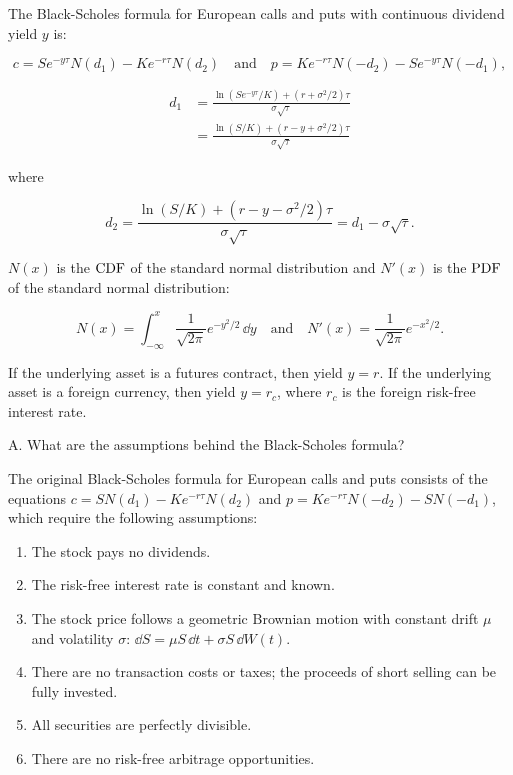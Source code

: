 The Black-Scholes formula for European calls and puts with continuous dividend yield $y$
is:

\[
c=Se^{-y\tau}N(d_1)-Ke^{-r\tau}N(d_2)\quad\text{and}\quad
p=Ke^{-r\tau}N(-d_2)-Se^{-y\tau}N(-d_1),
\]


\[
\begin{aligned}
d_1&=\frac{\ln(Se^{-y\tau}/K)+(r+\sigma^2/2)\tau}{\sigma\sqrt{\tau}}\\
&=\frac{\ln(S/K)+(r-y+\sigma^2/2)\tau}{\sigma\sqrt{\tau}}
\end{aligned}
\]

where

\[
d_2=\frac{\ln(S/K)+(r-y-\sigma^2/2)\tau}{\sigma\sqrt{\tau}}=d_1-\sigma\sqrt{\tau}.
\]

$N(x)$ is the $\mathrm{CDF}$ of the standard normal distribution and $N'(x)$ is the $\mathrm{PDF}$ of the
standard normal distribution:

\[
N(x)=\int_{-\infty}^{x}\frac{1}{\sqrt{2\pi}}e^{-y^2/2}\,\dd y
\quad\text{and}\quad N'(x)=\frac{1}{\sqrt{2\pi}}e^{-x^2/2}.
\]

If the underlying asset is a futures contract, then yield $y=r$. If the underlying asset is a
foreign currency, then yield $y=r_c$, where $r_c$ is the foreign risk-free interest rate.

\begin{problem}{A. What are the assumptions behind the Black-Scholes formula?}
\end{problem}

\begin{solution}
The original Black-Scholes formula for European calls and puts consists of the equations
$c=SN(d_1)-Ke^{-r\tau}N(d_2)$ and
$p=Ke^{-r\tau}N(-d_2)-SN(-d_1)$, which require the following assumptions:

\begin{enumerate}
\item The stock pays no dividends.
\item The risk-free interest rate is constant and known.
\item The stock price follows a geometric Brownian motion with constant drift $\mu$ and
volatility $\sigma$: $\dd S=\mu S\,\dd t+\sigma S\,\dd W(t)$.
\item There are no transaction costs or taxes; the proceeds of short selling can be fully
invested.
\item All securities are perfectly divisible.
\item There are no risk-free arbitrage opportunities.
\end{enumerate}

\end{solution}

